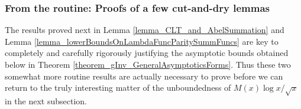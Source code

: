 \documentclass[11pt,reqno,a4letter]{article}
\numberwithin{figure}{section}
\numberwithin{table}{section}
\theoremstyle{plain}
\numberwithin{theorem}{section}
\theoremstyle{definition}
\begin{document}
\subsubsection{From the routine: Proofs of a few cut-and-dry lemmas} 
\label{subsubSection_RoutineProofsNeededForMainBoundOnGInvxFunc} 

The results proved next in Lemma \ref{lemma_CLT_and_AbelSummation} and 
Lemma \ref{lemma_lowerBoundsOnLambdaFuncParitySummFuncs} 
are key to completely and carefully rigorously justifying the 
asymptotic bounds obtained below in Theorem \ref{theorem_gInv_GeneralAsymptoticsForms}. 
Thus these two somewhat more routine results are actually 
necessary to prove before we can return to the truly 
interesting matter of the unboundedness of $M(x) \log x / \sqrt{x}$ in the next subsection. 
\end{document}
